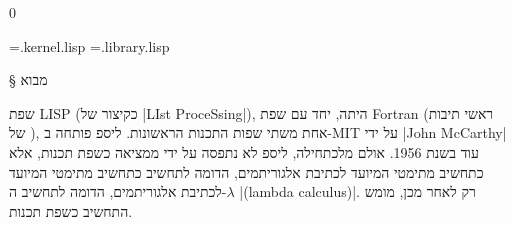 
\def\CPL{\E|C|\xspace}

\setcounter{library}0

\newread \tempFile %
\newwrite {} %
\newwrite \libraryFile %
\immediate \openout {}=\jobname.kernel.lisp
\immediate \openout \libraryFile=\jobname.library.lisp

\newenvironment{KERNEL}{%
  \stepcounter{kernel}
  \def\fileName{\jobname.kernel.\arabic{kernel}.lisp}%
  \csname filecontents*\endcsname[overwrite]{\fileName}%
}{%
  \csname endfilecontents*\endcsname%
  \LTR
  \endLTR
  \openin \tempFile=\fileName
  \begingroup\endlinechar=-1
  \loop\unless\ifeof \tempFile
  \read\tempFile to\fileline %
  \immediate\write \kernelFile
  {\unexpanded\expandafter{\fileline}}
  \repeat
  \endgroup
  \closein \tempFile
}

\newenvironment{LIBRARY}{%
  \stepcounter{library}
  \def\fileName{\jobname.library.\arabic{library}.lisp}%
  \csname filecontents*\endcsname[overwrite]{\fileName}%
}{%
  \csname endfilecontents*\endcsname%
  \LTR
  \endLTR
  \newread \tempFile %
  \openin \tempFile=\fileName
  \begingroup\endlinechar=-1
  \loop\unless\ifeof \tempFile
  \read\tempFile to\fileline %
  \immediate\write \libraryFile
  {\unexpanded\expandafter{\fileline}} %
  \repeat
  \endgroup
  \closein \tempFile
}

%
§ מבוא

שפת LISP (כקיצור של \E|LIst ProceSsing|), היתה, יחד עם שפת Fortran (ראשי
תיבות של ), אחת משתי שפות התכנות הראשונות. ליספ פותחה
ב-MIT על ידי \E|John McCarthy| עוד בשנת 1956. אולם מלכתחילה, ליספ לא נתפסה על
ידי ממציאה כשפת תכנות, אלא כתחשיב מתימטי המיועד לכתיבת אלגוריתמים, הדומה לתחשיב
כתחשיב מתימטי המיועד לכתיבת אלגוריתמים, הדומה לתחשיב
ה-$λ$ \E|(lambda calculus)|. רק לאחר מכן, מומש התחשיב כשפת תכנות.

